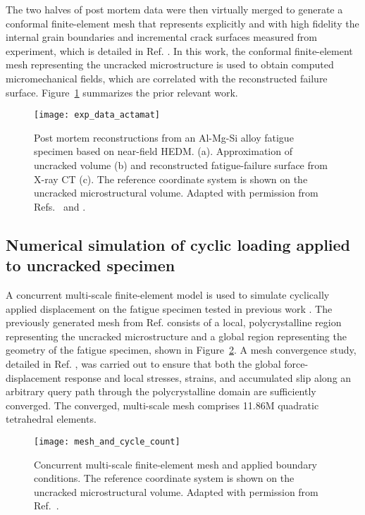 The two halves of post mortem data were then virtually merged to generate a conformal finite-element mesh that represents explicitly and with high fidelity the internal grain boundaries and incremental crack surfaces measured from experiment, which is detailed in Ref. \cite{spear2016}. In this work, the conformal finite-element mesh representing the uncracked microstructure is used to obtain computed micromechanical fields, which are correlated with the reconstructed failure surface. Figure~\ref{fig:exp_data_actamat} summarizes the prior relevant work.
\begin{figure}[t]
  \centering
    \texttt{[image: exp\_data\_actamat]}
    \caption{Post mortem reconstructions from an Al-Mg-Si alloy fatigue specimen based on near-field HEDM. (a). Approximation of uncracked volume (b) and reconstructed fatigue-failure surface from X-ray CT (c). The reference coordinate system is shown on the uncracked microstructural volume. Adapted with permission from Refs.\ \cite{spear2016} and \cite{spear2014}.}
    \label{fig:exp_data_actamat}
\end{figure}

\subsection{Numerical simulation of cyclic loading applied to uncracked specimen} \label{simulation}
A concurrent multi-scale finite-element model is used to simulate cyclically applied displacement on the fatigue specimen tested in previous work \cite{spear2016}. The previously generated mesh from Ref. \cite{spear2016} consists of a local, polycrystalline region representing the uncracked microstructure and a global region representing the geometry of the fatigue specimen, shown in Figure~\ref{fig:mesh_and_cycle_count}. A mesh convergence study, detailed in Ref. \cite{spear2014numerical}, was carried out to ensure that both the global force-displacement response and local stresses, strains, and accumulated slip along an arbitrary query path through the polycrystalline domain are sufficiently converged. The converged, multi-scale mesh comprises 11.86M quadratic tetrahedral elements.
\begin{figure}[b]
  \centering
    \texttt{[image: mesh\_and\_cycle\_count]}
    \caption{Concurrent multi-scale finite-element mesh and applied boundary conditions. The reference coordinate system is shown on the uncracked microstructural volume. Adapted with permission from Ref.\ \cite{spear2016}.}
    \label{fig:mesh_and_cycle_count}
\end{figure}

